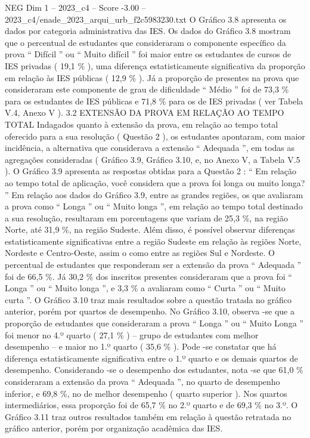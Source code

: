 \begin{textsample}{NEG Dim 1 – 2023\_c4 – Score -3.00 – 2023\_c4/enade\_2023\_arqui\_urb\_f2c5983230.txt}
O Gráfico 3.8 apresenta os dados por categoria administrativa das IES.
Os dados do Gráfico 3.8 mostram que o percentual de estudantes que consideraram o componente específico da prova “ Difícil ” ou “ Muito difícil ” foi maior entre os estudantes de cursos de IES privadas ( 19,1 \% ), uma diferença estatisticamente significativa da proporção em relação às IES públicas ( 12,9 \% ).
Já a proporção de presentes na prova que consideraram este componente de grau de dificuldade “ Médio ” foi de 73,3 \% para os estudantes de IES públicas e 71,8 \% para os de IES privadas ( ver Tabela V.4, Anexo V ). 3.2 EXTENSÃO DA PROVA EM RELAÇÃO AO TEMPO TOTAL Indagados quanto à extensão da prova, em relação ao tempo total oferecido para a sua resolução ( Questão 2 ), os estudantes apontaram, com maior incidência, a alternativa que considerava a extensão “ Adequada ”, em todas as agregações consideradas ( Gráfico 3.9, Gráfico 3.10, e, no Anexo V, a Tabela V.5 ).
O Gráfico 3.9 apresenta as respostas obtidas para a Questão 2 : “ Em relação ao tempo total de aplicação, você considera que a prova foi longa ou muito longa? ” Em relação aos dados do Gráfico 3.9, entre as grandes regiões, os que avaliaram a prova como “ Longa ” ou “ Muito longa ”, em relação ao tempo total destinado a sua resolução, resultaram em porcentagens que variam de 25,3 \%, na região Norte, até 31,9 \%, na região Sudeste.
Além disso, é possível observar diferenças estatisticamente significativas entre a região Sudeste em relação às regiões Norte, Nordeste e Centro-Oeste, assim o como entre as regiões Sul e Nordeste.
O percentual de estudantes que responderam ser a extensão da prova “ Adequada ” foi de 66,5 \%.
Já 30,2 \% dos inscritos presentes consideraram que a prova foi “ Longa ” ou “ Muito longa ”, e 3,3 \% a avaliaram como “ Curta ” ou “ Muito curta ”.
O Gráfico 3.10 traz mais resultados sobre a questão tratada no gráfico anterior, porém por quartos de desempenho.
No Gráfico 3.10, observa -se que a proporção de estudantes que consideraram a prova “ Longa ” ou “ Muito Longa ” foi menor no 4.º quarto ( 27,1 \% ) – grupo de estudantes com melhor desempenho – e maior no 1.º quarto ( 35,6 \% ).
Pode -se constatar que há diferença estatisticamente significativa entre o 1.º quarto e os demais quartos de desempenho.
Considerando -se o desempenho dos estudantes, nota -se que 61,0 \% consideraram a extensão da prova “ Adequada ”, no quarto de desempenho inferior, e 69,8 \%, no de melhor desempenho ( quarto superior ).
Nos quartos intermediários, essa proporção foi de 65,7 \% no 2.º quarto e de 69,3 \% no 3.º.
O Gráfico 3.11 traz outros resultados também em relação à questão retratada no gráfico anterior, porém por organização acadêmica das IES.

\end{textsample}
